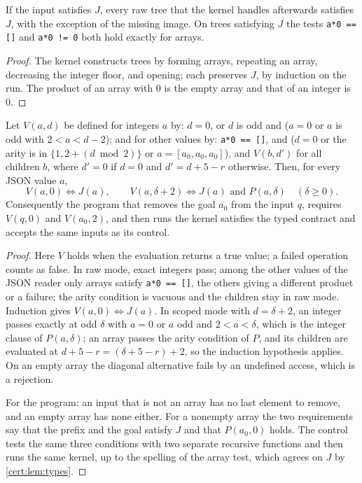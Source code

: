 \begin{lemma}\label{cert:lem:types}
If the input satisfies $J$, every raw tree that the kernel handles afterwards
satisfies $J$, with the exception of the missing image. On trees satisfying
$J$ the tests \texttt{a*0 == []} and \texttt{a*0 != 0} both hold exactly for
arrays.
\end{lemma}
\begin{proof}
The kernel constructs trees by forming arrays, repeating an array, decreasing
the integer floor, and opening; each preserves $J$, by induction on the run.
The product of an array with $0$ is the empty array and that of an integer is
$0$.
\end{proof}

\begin{theorem}\label{cert:thm:validated-core}
Let $V(a,d)$ be defined for integers $a$ by: $d=0$, or $d$ is odd and ($a=0$
or $a$ is odd with $2<a<d-2$); and for other values by: \texttt{a*0 == []},
and ($d=0$ or the arity is in $\{1,2+(d\bmod 2)\}$ or $a=[a_0,a_0,a_0]$), and
$V(b,d')$ for all children $b$, where $d'=0$ if $d=0$ and $d'=d+5-r$
otherwise. Then, for every JSON value $a$,
\[
V(a,0)\iff J(a),\qquad V(a,\delta+2)\iff J(a)\text{ and }P(a,\delta)\quad(\delta\ge 0).
\]
Consequently the program that removes the goal $a_0$ from the input $q$,
requires $V(q,0)$ and $V(a_0,2)$, and then runs the kernel satisfies the typed
contract and accepts the same inputs as its control.
\end{theorem}
\begin{proof}
Here $V$ holds when the evaluation returns a true value; a failed operation
counts as false. In raw mode, exact integers pass; among the other values of
the JSON reader only arrays satisfy \texttt{a*0 == []}, the others giving a
different product or a failure; the arity condition is vacuous and the
children stay in raw mode. Induction gives $V(a,0)\iff J(a)$. In scoped mode
with $d=\delta+2$, an integer passes exactly at odd $\delta$ with $a=0$ or
$a$ odd and $2<a<\delta$, which is the integer clause of $P(a,\delta)$; an
array passes the arity condition of $P$, and its children are evaluated at
$d+5-r=(\delta+5-r)+2$, so the induction hypothesis applies. On an empty
array the diagonal alternative fails by an undefined access, which is a
rejection.

For the program: an input that is not an array has no last element to
remove, and an empty array has none either. For a nonempty array the two
requirements say that the prefix and the goal satisfy $J$ and that
$P(a_0,0)$ holds. The control tests the same three conditions with two
separate recursive functions and then runs the same kernel, up to the
spelling of the array test, which agrees on $J$ by \cref{cert:lem:types}.
\end{proof}

